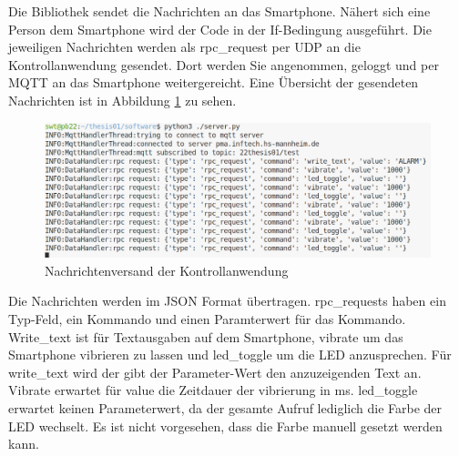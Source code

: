 \documentclass[11pt,a4paper]{report}
\begin{document}
Die Bibliothek sendet die Nachrichten an das Smartphone.
Nähert sich eine Person dem Smartphone wird der Code in der If-Bedingung ausgeführt.
Die jeweiligen Nachrichten werden als rpc\_request per UDP an die Kontrollanwendung gesendet.
Dort werden Sie angenommen, geloggt und per MQTT an das Smartphone weitergereicht.
Eine Übersicht der gesendeten Nachrichten ist in Abbildung \ref{fig:req_controll_app} zu sehen.
\begin{figure}[htbp]
  \centering
  \includegraphics[width=\textwidth]{images/server_requests}
  \caption{Nachrichtenversand der Kontrollanwendung}
  \label{fig:req_controll_app}
\end{figure}
Die Nachrichten werden im JSON Format übertragen.
rpc\_requests haben ein Typ-Feld, ein Kommando und einen Paramterwert für das Kommando.
Write\_text ist für Textausgaben auf dem Smartphone, vibrate um das Smartphone vibrieren zu lassen und led\_toggle um die LED anzusprechen.
Für write\_text wird der gibt der Parameter-Wert den anzuzeigenden Text an.
Vibrate erwartet für value die Zeitdauer der vibrierung in ms.
led\_toggle erwartet keinen Parameterwert, da der gesamte Aufruf lediglich die Farbe der LED wechselt.
Es ist nicht vorgesehen, dass die Farbe manuell gesetzt werden kann.
\end{document}
